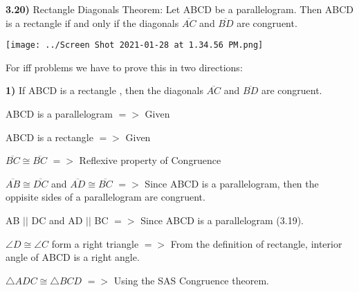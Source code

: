 \documentclass{article}
\begin{document}
\newpage

\textbf{3.20)} Rectangle Diagonals Theorem: Let ABCD be a parallelogram. Then ABCD is a rectangle if and only if the diagonals $\overline{AC}$ and $\overline{BD}$ are congruent.

\vspace{2mm}

\texttt{[image: ../Screen Shot 2021-01-28 at 1.34.56 PM.png]}



For iff problems we have to prove this in two directions:

\vspace{3mm}

	\textbf{1)}  If ABCD is a rectangle , then the diagonals  $\overline{AC}$ and $\overline{BD}$ are congruent.

\vspace{3mm}

ABCD is a parallelogram $=>$ Given

\vspace{3mm}

ABCD is a rectangle $ =>$ Given

\vspace{3mm}


$\overline{BC} \displaystyle \cong \overline{BC}$ $=>$ Reflexive property
of Congruence 

\vspace{3mm}


$\overline{AB} \displaystyle \cong  \overline{DC}$ and $\overline{AD} \displaystyle \cong  \overline{BC}$  $=>$ Since ABCD is a parallelogram, then the oppisite sides of a parallelogram are congruent. 

\vspace{3mm}

AB $||$ DC and AD $||$ BC $=>$ Since ABCD is a parallelogram (3.19).

\vspace{3mm}


$\angle{D} \displaystyle \cong \angle{C}$ form a right triangle $=>$ From the definition of rectangle, interior angle of ABCD is a right angle.

\vspace{3mm}


$\triangle ADC \displaystyle \cong \triangle BCD$ $ = >$ Using the SAS Congruence theorem. 

\vspace{2mm}
\end{document}

